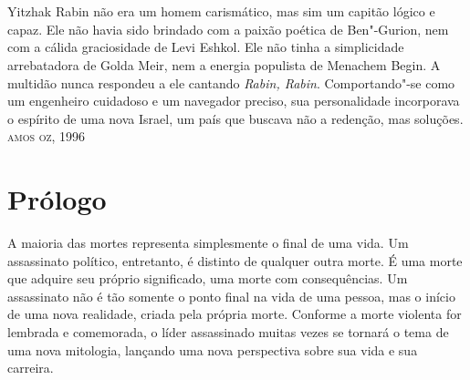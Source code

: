 \chapter*{}
\thispagestyle{empty}
\vfill{}

\begin{flushright}
\textit\small{Yitzhak Rabin não era um homem carismático, mas sim um capitão lógico e
capaz. Ele não havia sido brindado com a paixão poética de Ben"-Gurion, nem com
a cálida graciosidade de Levi Eshkol. Ele não tinha a simplicidade arrebatadora de Golda Meir, nem a energia
populista de Menachem Begin. A multidão nunca respondeu a ele cantando \textit{Rabin, Rabin}. Comportando"-se como um engenheiro cuidadoso e um navegador preciso, sua personalidade incorporava o espírito de uma nova Israel, um país que
buscava não a redenção, mas soluções.}\\
\smallskip
\textsc{amos oz, 1996}
\end{flushright}

\chapter[Prólogo]{Prólogo }

A maioria das mortes representa simplesmente o final de uma vida. Um
assassinato político, entretanto, é distinto de qualquer outra morte. É
uma morte que adquire seu próprio significado, uma morte com
consequências. Um assassinato não é tão somente o ponto final na vida de
uma pessoa, mas o início de uma nova realidade, criada pela própria
morte. Conforme a morte violenta for lembrada e comemorada, o líder
assassinado muitas vezes se tornará o tema de uma nova mitologia,
lançando uma nova perspectiva sobre sua vida e sua carreira.


